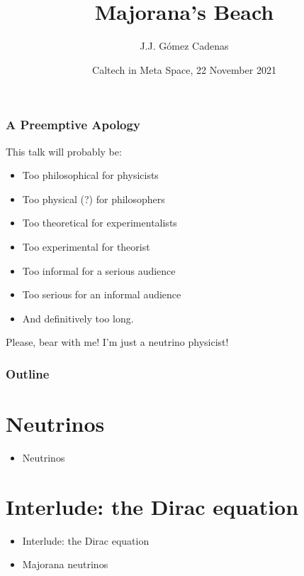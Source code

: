 \documentclass[9pt]{beamer}
\title{Majorana's Beach}
\author{J.J. G\'omez Cadenas}
\institute{Donostia International Physics Center (DIPC)} %
\date[November 22, 2021] %
{Caltech in Meta Space, 22 November 2021}
\begin{document}
\frame{\titlepage}

\begin{frame}
\frametitle{A Preemptive Apology}
This talk will probably be:

\begin{itemize}
\item Too philosophical for physicists
\item Too physical (?) for philosophers
\item Too theoretical for experimentalists
\item Too experimental for theorist
\item Too informal for a serious audience
\item Too serious for an informal audience 
\item And definitively too long.
\end{itemize}
\alert{Please, bear with me! I'm just a neutrino physicist!}

\end{frame}

\begin{frame}
\frametitle{Outline}
\tableofcontents
\end{frame}

\section{Neutrinos}
\begin{frame}
\begin{itemize}
\item Neutrinos
\end{itemize}
\end{frame}



\section{Interlude: the Dirac equation}

\begin{frame}
\begin{itemize}
\item Interlude: the Dirac equation
\end{itemize}
\end{frame}






\begin{frame}
\begin{itemize}
\item Majorana neutrinos
\end{itemize}
\end{frame}
\end{document}
